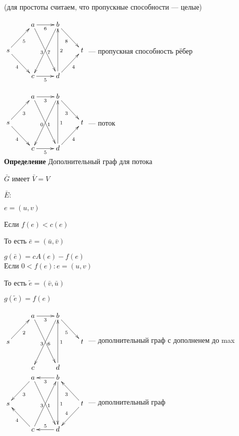 \documentclass[a4paper, 12pt] {article}
\begin{document}
(для простоты считаем, что пропускные способности --- целые)

$\begin{matrix}
	\xymatrix{
		& a  \ar@{->}[r]_6 \ar@{->}[rdd]_3 & b \ar@{->}[rd]_8 \\
		s \ar@{->}[rd]_4 \ar@{->}[ru]_5 &  & & t \\
		& c \ar@{->}[r]_5 \ar@{<-}[ruu]_7 & d \ar@{->}[ru]_4 \ar@{->}[uu]_2 \\
	}
\end{matrix}$ --- пропускная способность рёбер

$\begin{matrix}
	\xymatrix{
		& a  \ar@{->}[r]_3 \ar@{->}[rdd]_0 & b \ar@{->}[rd]_3 \\
		s \ar@{->}[rd]_4 \ar@{->}[ru]_3 &  & & t \\
		& c \ar@{->}[r]_5 \ar@{<-}[ruu]_1 & d \ar@{->}[ru]_4 \ar@{->}[uu]_1 \\
	}
\end{matrix}$ --- поток\\

\textbf{Определение} Дополнительный граф для потока

$ \bar G $ имеет $ \bar V = V $

$ \bar E: $

$ e = (u, v) $

Если $ f(e) < c (e) $

То есть $ \bar e = (\bar u, \bar v) $

$ g(\bar e) = cA(e) - f(e) $\\

Если $ 0 < f(e): e = (u, v) $

То есть $ \tilde e = (\bar v, \bar u) $

$ g(\tilde e) = f(e) $

$\begin{matrix}
	\xymatrix{
		& a  \ar@{->}[r]_3 \ar@{->}[rdd]_3 & b \ar@{->}[rd]_5 \\
		s  \ar@{->}[ru]_2 &  & & t \\
		& c \ar@{<-}[ruu]_6 & d \ar@{->}[uu]_1 \\
	}
\end{matrix}$ --- дополнительный граф с дополненем до max\\

$\begin{matrix}
	\xymatrix{
		& a  \ar@{<-}[r]_3 \ar@{->}[rdd]_3 & b \ar@{<-}[rd]_3 \\
		s  \ar@{<-}[ru]_3 \ar@{<-}[rd]_4 &  & & t \ar@{->}[ld]_4 \\
		& c \ar@{->}[ruu]_1 & d \ar@{<-}[uu]_1 \ar@{->}[l]_5 \\
	}
\end{matrix}$ --- дополнительный граф\\
\end{document}
